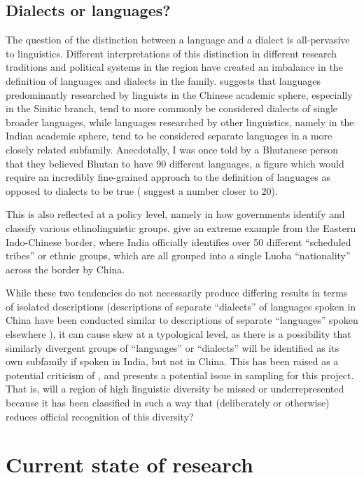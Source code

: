 \subsection{Dialects or languages?}\label{s:DialectsorLanguages}
The question of the distinction between a language and a dialect is all-pervasive to linguistics. Different interpretations of this distinction in different research traditions and political systems in the region have created an imbalance in the definition of languages and dialects in the family.  suggests that languages predominantly researched by linguists in the Chinese academic sphere, especially in the Sinitic branch, tend to more commonly be considered dialects of single broader languages, while languages researched by other linguistics, namely in the Indian academic sphere, tend to be considered separate languages in a more closely related subfamily. Anecdotally, I was once told by a Bhutanese person that they believed Bhutan to have 90 different languages, a figure which would require an incredibly fine-grained approach to the definition of languages as opposed to dialects to be true ( suggest a number closer to 20).

This is also reflected at a policy level, namely in how governments identify and classify various ethnolinguistic groups.  give an extreme example from the Eastern Indo-Chinese border, where India officially identifies over 50 different ``scheduled tribes'' or ethnic groups, which are all grouped into a single Luoba ``nationality'' across the border by China.

While these two tendencies do not necessarily produce differing results in terms of isolated descriptions (descriptions of separate ``dialects'' of languages spoken in China have been conducted similar to descriptions of separate ``languages'' spoken elsewhere \cites{Lai2017}{TaylorAdams2020}), it can cause skew at a typological level, as there is a possibility that similarly divergent groups of ``languages'' or ``dialects'' will be identified as its own subfamily if spoken in India, but not in China. This has been raised as a potential criticism of  \cite{LaPolla2016}, and presents a potential issue in sampling for this project. That is, will a region of high linguistic diversity be missed or underrepresented because it has been classified in such a way that (deliberately or otherwise) reduces official recognition of this diversity?


\section{Current state of research}\label{s:THOverview:CurrentResearch}
